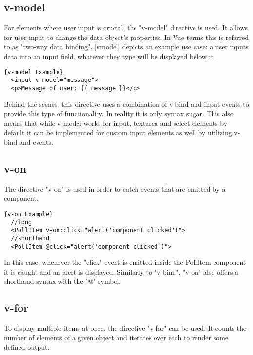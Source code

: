 \subsection{v-model} \label{sub:vmodel}
For elements where user input is crucial, the "v-model" directive is used. It allows for user input to change the data object's properties. In Vue terms this is referred to as "two-way data binding". \autoref{vmodel} depicts an example use case: a user inputs data into an input field, whatever they type will be displayed below it. \newline

\begin{lstlisting}[caption=v-model Example, captionpos=b, style=htmlcssjs, label=vmodel]{v-model Example}
  <input v-model="message">
  <p>Message of user: {{ message }}</p>
\end{lstlisting}

Behind the scenes, this directive uses a combination of v-bind and input events to provide this type of functionality. In reality it is only syntax sugar. This also means that while v-model works for input, textarea and select elements by default it can be implemented for custom input elements as well by utilizing v-bind and events.

\subsection{v-on}
The directive "v-on" is used in order to catch events that are emitted by a component. \newline

\begin{lstlisting}[caption=v-on Example, captionpos=b, style=htmlcssjs, label=vmodel]{v-on Example}
  //long
  <PollItem v-on:click="alert('component clicked')">
  //shorthand
  <PollItem @click="alert('component clicked')">
\end{lstlisting}

In this case, whenever the "click" event is emitted inside the PollItem component it is caught and an alert is displayed. Similarly to "v-bind", "v-on" also offers a shorthand syntax with the "@" symbol. 

\subsection{v-for}
To display multiple items at once, the directive "v-for" can be used. It counts the number of elements of a given object and iterates over each to render some defined output. \newline

